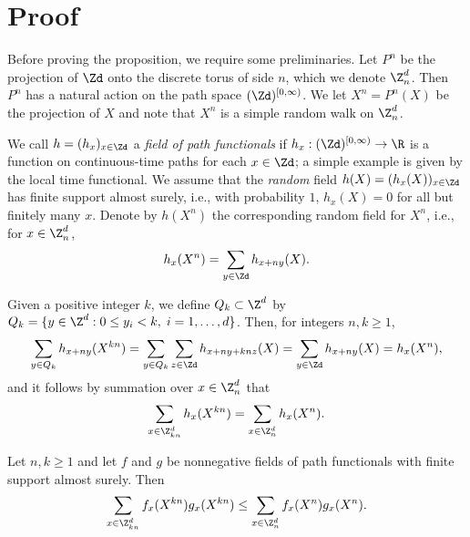
\section{Proof}

Before proving the proposition, we require some preliminaries.
Let $P^n$ be the projection
of $\Zd$ onto the discrete torus of side $n$,
which we denote $\Z_n^d$.
Then $P^n$ has a natural action
on the path space $(\Zd)^{[0,\infty)}$. We let
$X^n = P^n(X)$ be the projection of $X$
and note that $X^n$ is a simple random walk on $\Z^d_n$.

We call $h = (h_x)_{x\in\Zd}$ a \emph{field of path functionals} if
$h_x : (\Zd)^{[0,\infty)} \to \R$ is a function on continuous-time paths
for each $x \in \Zd$;
a simple example is given by the local time functional.
We assume that the \emph{random} field $h(X) = (h_x(X))_{x\in\Zd}$
has finite support almost surely, i.e.,
with probability $1$, $h_x(X) = 0$ for all but finitely many $x$.
Denote by $h(X^n)$ the corresponding random field for $X^n$, i.e., for $x \in \Z_n^d$,
\begin{equation}
h_x(X^n) = \sum_{y\in\Zd} h_{x+ny}(X).
\end{equation}

Given a positive integer $k$, we define
$Q_k \subset \Z^d$ by $Q_k = \{y \in \Z^d : 0 \le y_i < k, \;   i=1,\ldots,d\}$.
Then, for integers $n,k \ge 1$,
\begin{equation}
\label{e:ffold1}
    \sum_{y \in Q_k} h_{x+ny}(X^{kn})
  = \sum_{y \in Q_k} \sum_{z\in\Zd} h_{x+ny+knz}(X)
  = \sum_{y\in\Zd} h_{x+ny}(X)
  = h_x(X^n),
\end{equation}
and it follows by summation over $x \in \Z^d_n$ that
\begin{equation}
\label{e:ffold2}
\sum_{x\in\Z^d_{kn}} h_x(X^{kn})
  =
\sum_{x\in\Z^d_n} h_x(X^n).
\end{equation}

\begin{lemma}
\label{lem:mono}
Let $n,k \ge 1$ and let $f$ and $g$ be nonnegative fields of path functionals
with finite support almost surely.
Then
\begin{equation}
\sum_{x\in\Z^d_{kn}} f_x(X^{kn}) g_x(X^{kn})
  \leq
\sum_{x\in\Z^d_n} f_x(X^n) g_x(X^n).
\end{equation}
\end{lemma}

